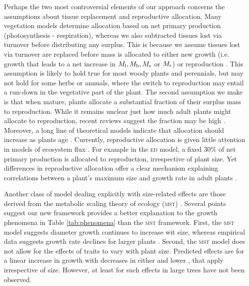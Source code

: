 \documentclass[9pt,twocolumn,twoside,lineno]{pnas-new}
\begin{document}
Perhaps the two most controversial elements of our approach concerns the assumptions about tissue replacement and reproductive allocation. Many vegetation models determine allocation based on net primary production (photosynthesis - respiration), whereas we also subtracted tissues lost via turnover before distributing any surplus. This is because we assume tissues lost via turnover are replaced before mass is allocated to either new growth (i.e. growth that leads to a net increase in $M_{\rm l}, M_{\rm b}, M_{\rm s}$ or $M_{\rm r}$) or reproduction \citep{Thornley-2000}. This assumption is likely to hold true for most woody plants and perennials, but may not hold for some herbs or annuals, where the switch to reproduction may entail a run-down in the vegetative part of the plant. The second assumption we make is that when mature, plants allocate a substantial fraction of their surplus mass to reproduction. While it remains unclear just how much adult plants might allocate to reproduction, recent reviews suggest the fraction may be high \citep{Thomas-2011, Wenk-2015}. Moreover, a long line of theoretical models indicate that allocation should increase as plants age \citep[reviewed by ][]{Wenk-2015}. Currently, reproductive allocation is given little attention in models of ecosystem flux \citep[e.g.][]{Sitch-2008, DeKauwe-2014}. For example in the \textsc{ed} model, a fixed 30\% of net primary production is allocated to reproduction, irrespective of plant size. Yet differences in reproductive allocation offer a clear mechanism explaining correlations between a plant's maximum size and growth rate in adult plants \citep[e.g.][]{Wright-2010}.

Another class of model dealing explicitly with size-related effects are those derived from the metabolic scaling theory  of ecology (\textsc{mst}) \citep{Enquist-1999, Enquist-2007}. Several points suggest our new framework provides a better explanation to the growth phenomena in Table \ref{tab:phenomena} than the \textsc{mst} framework. First, the \textsc{mst} model suggests diameter growth continues to increase wit size, whereas empirical data suggests growth rate declines for larger plants \citep{Canham-2004, Canham-2006, Herault-2011}. Second, the \textsc{mst} model does not allow for the effects of traits to vary with plant size. Predicted effects are for a linear increase in growth with decreases in either {\lma} and lower {\wood}, that apply irrespective of size. However, at least for {\lma} such effects in large trees have not been observed.
\end{document}
